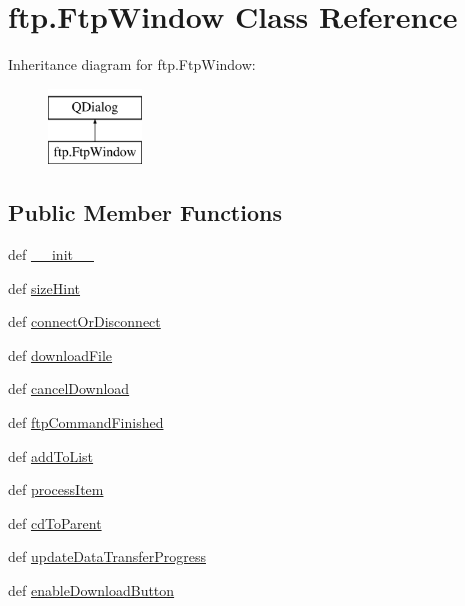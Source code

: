 \hypertarget{classftp_1_1FtpWindow}{}\section{ftp.\+Ftp\+Window Class Reference}
\label{classftp_1_1FtpWindow}
Inheritance diagram for ftp.\+Ftp\+Window\+:\begin{figure}[H]
\begin{center}
\leavevmode
\includegraphics[height=2.000000cm]{classftp_1_1FtpWindow}
\end{center}
\end{figure}
\subsection*{Public Member Functions}
\begin{DoxyCompactItemize}
\item 
def \hyperlink{classftp_1_1FtpWindow_ae03198246f3be08a1ac3424113a92241}{\+\_\+\+\_\+init\+\_\+\+\_\+}
\item 
def \hyperlink{classftp_1_1FtpWindow_a5522bf7db36ea20524572c571e577c3a}{size\+Hint}
\item 
def \hyperlink{classftp_1_1FtpWindow_a286efc61894309ee204ee22d49c68e72}{connect\+Or\+Disconnect}
\item 
def \hyperlink{classftp_1_1FtpWindow_a84aa094ddd5a9f5e54cce5941e10e9b0}{download\+File}
\item 
def \hyperlink{classftp_1_1FtpWindow_a48530a7386e4e641151af49d472c0f55}{cancel\+Download}
\item 
def \hyperlink{classftp_1_1FtpWindow_a8d0d47e170f0578020de0afcea3514a3}{ftp\+Command\+Finished}
\item 
def \hyperlink{classftp_1_1FtpWindow_a8eebf375baeb1b2690b1716d3281bf9c}{add\+To\+List}
\item 
def \hyperlink{classftp_1_1FtpWindow_a728aa08ebb5fb2a54d45e793191a3143}{process\+Item}
\item 
def \hyperlink{classftp_1_1FtpWindow_a07fa9337f4692ac9e87bc863ffe6e254}{cd\+To\+Parent}
\item 
def \hyperlink{classftp_1_1FtpWindow_a4ba70786339f32e63a9e7a568b141935}{update\+Data\+Transfer\+Progress}
\item 
def \hyperlink{classftp_1_1FtpWindow_a826216cfbc85e62e7e3c106a12384738}{enable\+Download\+Button}
\end{DoxyCompactItemize}
